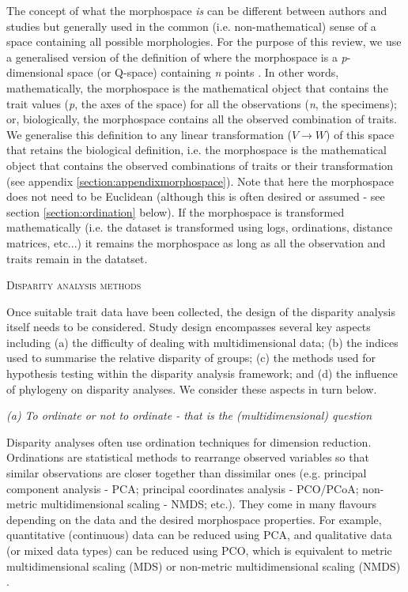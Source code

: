 \documentclass[12pt,letterpaper]{article}
\renewcommand{\section}[1]{%
\bigskip
\begin{center}
\begin{Large}
\normalfont\scshape #1
\medskip
\end{Large}
\end{center}}
\renewcommand{\subsection}[1]{%
\bigskip
\begin{center}
\begin{large}
\normalfont\itshape #1
\end{large}
\end{center}}
\begin{document}
The concept of what the morphospace \textit{is} can be different between authors and studies but generally used in the common (i.e. non-mathematical) sense of a space containing all possible morphologies.
For the purpose of this review, we use a generalised version of the definition of \cite{mitteroecker2009concept} where the morphospace is a \textit{p}-dimensional space (or Q-space) containing \textit{n} points \citep{mitteroecker2009concept}.
In other words, mathematically, the morphospace is the mathematical object that contains the trait values (\textit{p}, the axes of the space) for all the observations (\textit{n}, the specimens); or, biologically, the morphospace contains all the observed combination of traits.
We generalise this definition to any linear transformation ($V \to W$) of this space that retains the biological definition, i.e. the morphospace is the mathematical object that contains the observed combinations of traits or their transformation (see appendix \ref{section:appendixmorphospace}).
Note that here the morphospace does not need to be Euclidean (although this is often desired or assumed - see section \ref{section:ordination} below).
If the morphospace is transformed mathematically (i.e. the dataset is transformed using logs, ordinations, distance matrices, etc...) it remains the morphospace as long as all the observation and traits remain in the datatset.


\section{Disparity analysis methods}
\label{section:methods}

\noindent Once suitable trait data have been collected, the design of the disparity analysis itself needs to be considered.
Study design encompasses several key aspects including (a) the difficulty of dealing with multidimensional data; (b) the indices used to summarise the relative disparity of groups; (c) the methods used for hypothesis testing within the disparity analysis framework; and (d) the influence of phylogeny on disparity analyses.
We consider these aspects in turn below.

\subsection{(a) To ordinate or not to ordinate - that is the (multidimensional) question}
\label{section:ordination}

Disparity analyses often use ordination techniques for dimension reduction.
Ordinations are statistical methods to rearrange observed variables so that similar observations are closer together than dissimilar ones (e.g. principal component analysis - PCA; principal coordinates analysis - PCO/PCoA; non-metric multidimensional scaling - NMDS; etc.).
They come in many flavours depending on the data and the desired morphospace properties.
For example, quantitative (continuous) data can be reduced using PCA, and qualitative data (or mixed data types) can be reduced using PCO, which is equivalent to metric multidimensional scaling (MDS) or non-metric multidimensional scaling (NMDS) \citep[see][chapter 9 for a detailed overview of ordination methods and properties]{Legendre2012-va}.
\end{document}
